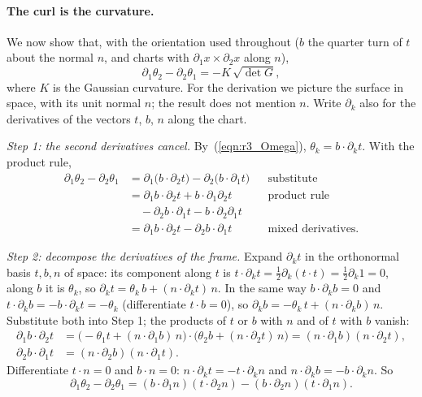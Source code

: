 \paragraph{The curl is the curvature.} We now show that, with the orientation used throughout ($b$ the quarter turn of $t$ about the normal $n$, and charts with $\partial_1x\times\partial_2x$ along $n$),
\begin{equation}
\label{eqn:r3_field_strength}
\partial_1\theta_2 - \partial_2\theta_1 = -K\, \sqrt{\det G} ,
\end{equation}
where $K$ is the Gaussian curvature. For the derivation we picture the surface in space, with its unit normal $n$; the result does not mention $n$. Write $\partial_k$ also for the derivatives of the vectors $t$, $b$, $n$ along the chart.

\emph{Step 1: the second derivatives cancel.} By~(\ref{eqn:r3_Omega}), $\theta_k = b\cdot\partial_kt$. With the product rule,
\begin{align*}
\partial_1\theta_2 - \partial_2\theta_1 &= \partial_1\big(b\cdot\partial_2t\big) - \partial_2\big(b\cdot\partial_1t\big) && \text{substitute} \\
&= \partial_1b\cdot\partial_2t + b\cdot\partial_1\partial_2t && \text{product rule} \\
&\quad - \partial_2b\cdot\partial_1t - b\cdot\partial_2\partial_1t \\
&= \partial_1b\cdot\partial_2t - \partial_2b\cdot\partial_1t && \text{mixed derivatives.}
\end{align*}

\emph{Step 2: decompose the derivatives of the frame.} Expand $\partial_kt$ in the orthonormal basis $t, b, n$ of space: its component along $t$ is $t\cdot\partial_kt = \frac12\partial_k(t\cdot t) = \frac12\partial_k 1 = 0$, along $b$ it is $\theta_k$, so $\partial_kt = \theta_k\, b + (n\cdot\partial_kt)\, n$. In the same way $b\cdot\partial_kb = 0$ and $t\cdot\partial_kb = -b\cdot\partial_kt = -\theta_k$ (differentiate $t\cdot b = 0$), so $\partial_kb = -\theta_k\, t + (n\cdot\partial_kb)\, n$. Substitute both into Step 1; the products of $t$ or $b$ with $n$ and of $t$ with $b$ vanish:
\begin{align*}
\partial_1b\cdot\partial_2t &= \big(-\theta_1 t + (n\cdot\partial_1b)\,n\big)\cdot\big(\theta_2 b + (n\cdot\partial_2t)\,n\big) = (n\cdot\partial_1b)(n\cdot\partial_2t) , \\
\partial_2b\cdot\partial_1t &= (n\cdot\partial_2b)(n\cdot\partial_1t) .
\end{align*}
Differentiate $t\cdot n = 0$ and $b\cdot n = 0$: $n\cdot\partial_kt = -t\cdot\partial_kn$ and $n\cdot\partial_kb = -b\cdot\partial_kn$. So
\begin{equation*}
\partial_1\theta_2 - \partial_2\theta_1 = (b\cdot\partial_1n)(t\cdot\partial_2n) - (b\cdot\partial_2n)(t\cdot\partial_1n) .
\end{equation*}

